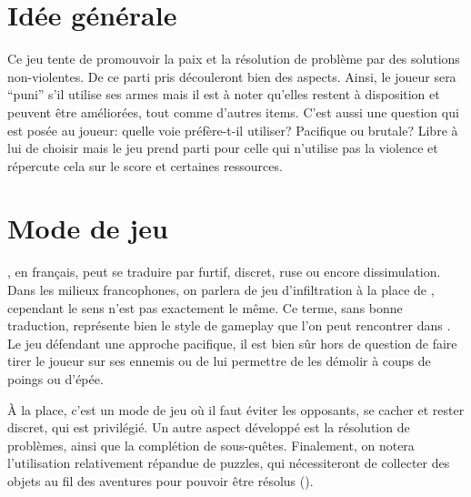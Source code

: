 \printMiniToc

\label{chap:gameplay}


\section{Idée générale}
Ce jeu tente de promouvoir la paix et la résolution de problème par des solutions non-violentes. De ce parti pris découleront bien des aspects. Ainsi, le joueur sera \enquote{puni} s'il utilise ses armes mais il est à noter qu'elles restent à disposition et peuvent être améliorées, tout comme d'autres items. C'est aussi une question qui est posée au joueur: quelle voie préfère-t-il utiliser? Pacifique ou brutale? Libre à lui de choisir mais le jeu prend parti pour celle qui n'utilise pas la violence et répercute cela sur le score et certaines ressources.

\section{Mode de jeu }
, en français, peut se traduire par furtif, discret, ruse ou encore dissimulation. Dans les milieux francophones, on parlera de jeu d'infiltration à la place de , cependant le sens n'est pas exactement le même. Ce terme, sans bonne traduction, représente bien le style de gameplay que l'on peut rencontrer dans \nomJeu. Le jeu défendant une approche pacifique, il est bien sûr hors de question de faire tirer le joueur sur ses ennemis ou de lui permettre de les démolir à coups de poings ou d'épée.

À la place, c'est un mode de jeu où il faut éviter les opposants, se cacher et rester discret, qui est privilégié. Un autre aspect développé est la résolution de problèmes, ainsi que la complétion de sous-quêtes. Finalement, on notera l'utilisation relativement répandue de puzzles, qui nécessiteront de collecter des objets au fil des aventures pour pouvoir être résolus ().


